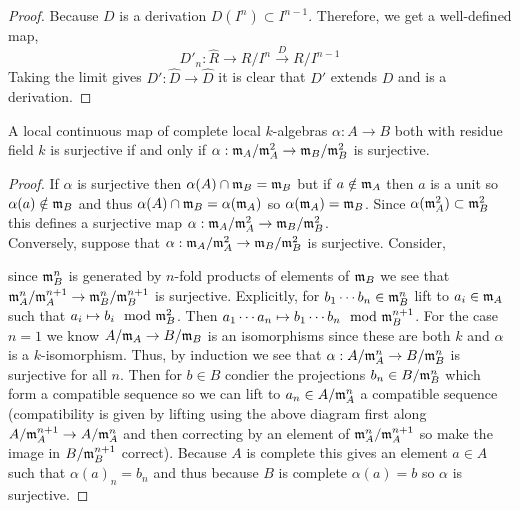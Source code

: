 \documentclass[12pt]{article}
\begin{document}
\begin{proof}
Because $D$ is a derivation $D(I^n) \subset I^{n-1}$. Therefore, we get a well-defined map,
\[ D'_n : \widehat{R} \to R / I^n \xrightarrow{D} R / I^{n-1} \]
Taking the limit gives $D' : \widehat{D} \to \widehat{D}$ it is clear that $D'$ extends $D$ and is a derivation.  
\end{proof}

\begin{lemma}
A local continuous map of complete local $k$-algebras $\alpha : A \to B$ both with residue field $k$ is surjective if and only if $\alpha : \mathfrak{m}_A/\mathfrak{m}_A^2 \to \mathfrak{m}_B / \mathfrak{m}_B^2$ is surjective.
\end{lemma}

\begin{proof}
If $\alpha$ is surjective then $\alpha(A) \cap \mathfrak{m}_B = \mathfrak{m}_B$ but if $a \notin \mathfrak{m}_A$ then $a$ is a unit so $\alpha(a) \notin \mathfrak{m}_B$ and thus $\alpha(A) \cap \mathfrak{m}_B = \alpha(\mathfrak{m}_A)$ so $\alpha(\mathfrak{m}_A) = \mathfrak{m}_B$. Since $\alpha(\mathfrak{m}_A^2) \subset \mathfrak{m}_B^2$ this defines a surjective map $\alpha : \mathfrak{m}_A / \mathfrak{m}_A^2 \to \mathfrak{m}_B / \mathfrak{m}_B^2$.
\bigskip\\
Conversely, suppose that $\alpha : \mathfrak{m}_A / \mathfrak{m}_A^2 \to \mathfrak{m}_B / \mathfrak{m}_B^2$ is surjective. Consider,
\begin{center}
\end{center}
since $\mathfrak{m}_B^n$ is generated by $n$-fold products of elements of $\mathfrak{m}_B$ we see that $\mathfrak{m}_A^n / \mathfrak{m}_A^{n+1} \to \mathfrak{m}_B^n/\mathfrak{m}_B^{n+1}$ is surjective. Explicitly, for $b_1 \cdots b_n \in \mathfrak{m}_B^n$ lift to $a_i \in \mathfrak{m}_A$ such that $a_i \mapsto b_i \mod {\mathfrak{m}}_B^2$. Then $a_1 \cdots a_n \mapsto b_1 \cdots b_n \mod {\mathfrak{m}}_{B}^{n+1}$. For the case $n = 1$ we  know $A / \mathfrak{m}_A \to B / \mathfrak{m}_B$ is an isomorphisms since these are both $k$ and $\alpha$ is a $k$-isomorphism. Thus, by induction we see that $\alpha : A / \mathfrak{m}_A^n \to B / \mathfrak{m}_B^n$ is surjective for all $n$. Then for $b \in B$ condier the projections $b_n \in B / \mathfrak{m}_B^n$ which form a compatible sequence so we can lift to $a_n \in A / \mathfrak{m}_A^n$ a compatible sequence (compatibility is given by lifting using the above diagram first along $A / \mathfrak{m}_A^{n+1} \to A / \mathfrak{m}_A^n$ and then correcting by an element of $\mathfrak{m}_A^n / \mathfrak{m}_A^{n+1}$ so make the image in $B / \mathfrak{m}_B^{n+1}$ correct). Because $A$ is complete this gives an element $a \in A$ such that $\alpha(a)_n = b_n$ and thus because $B$ is complete $\alpha(a) = b$ so $\alpha$ is surjective.
\end{proof}
\end{document}
